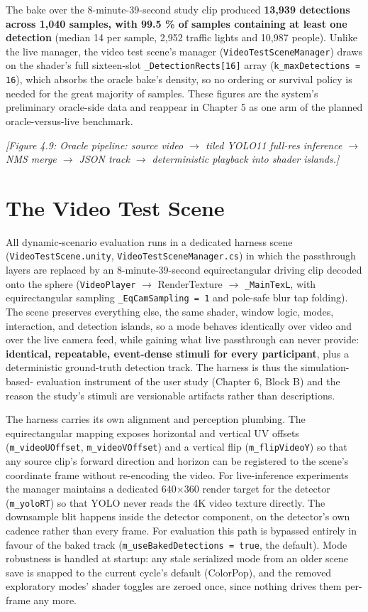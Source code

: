 The bake over the 8-minute-39-second study clip produced
\textbf{13,939 detections across 1,040 samples, with 99.5 \% of samples containing at least one
detection} (median 14 per sample, 2,952 traffic lights and 10,987 people). Unlike the live manager, the
video test scene's manager (\verb|VideoTestSceneManager|) draws on the shader's full sixteen-slot
\verb|_DetectionRects[16]| array (\verb|k_maxDetections = 16|), which absorbs the oracle bake's density,
so no ordering or survival policy is needed for the great majority of samples. These figures are the system's preliminary oracle-side data and reappear in Chapter 5 as
one arm of the planned oracle-versus-live benchmark.

\textit{[Figure 4.9: Oracle pipeline: source video $\rightarrow$ tiled YOLO11 full-res inference $\rightarrow$ NMS merge $\rightarrow$ JSON
track $\rightarrow$ deterministic playback into shader islands.]}

\section{The Video Test Scene}

All dynamic-scenario evaluation runs in a dedicated harness scene (\verb|VideoTestScene.unity|,
\verb|VideoTestSceneManager.cs|) in which the passthrough layers are replaced by an
8-minute-39-second equirectangular driving clip decoded onto the sphere (\verb|VideoPlayer| $\rightarrow$ RenderTexture $\rightarrow$ \verb|_MainTexL|,
with equirectangular sampling \verb|_EqCamSampling = 1| and pole-safe blur tap folding). The scene
preserves everything else, the same shader, window logic, modes, interaction, and detection islands,
so a mode behaves identically over video and over the live camera feed, while gaining what live
passthrough can never provide: \textbf{identical, repeatable, event-dense stimuli for every participant},
plus a deterministic ground-truth detection track. The harness is thus the simulation-based-
evaluation instrument of the user study (Chapter 6, Block B) and the reason the study's
stimuli are versionable artifacts rather than descriptions.

The harness carries its own alignment and perception plumbing. The equirectangular mapping exposes
horizontal and vertical UV offsets (\verb|m_videoUOffset|, \verb|m_videoVOffset|) and a vertical flip
(\verb|m_flipVideoY|) so that any source clip's forward direction and horizon can be registered to the
scene's coordinate frame without re-encoding the video. For live-inference experiments the manager
maintains a dedicated 640$\times$360 render target for the detector (\verb|m_yoloRT|) so that YOLO never reads
the 4K video texture directly. The downsample blit happens inside the detector component, on the
detector's own cadence rather than every frame. For evaluation this path is bypassed entirely in
favour of the baked track (\verb|m_useBakedDetections = true|, the default). Mode robustness is handled at
startup: any stale serialized mode from an older scene save is snapped to the current cycle's default
(ColorPop), and the removed exploratory modes' shader toggles are zeroed once, since nothing drives
them per-frame any more.

